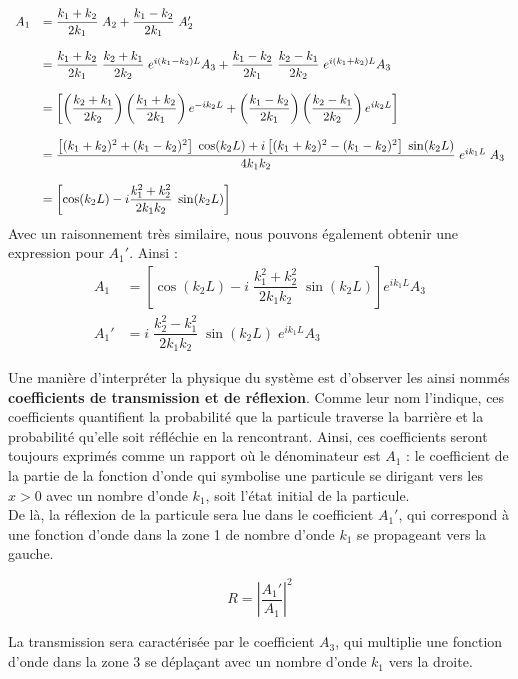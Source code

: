 \documentclass{book}
\begin{document}
$$
\begin{array}{ll}
  A_1 &=  \dfrac{k_1+k_2}{2k_1} \; A_2 + \dfrac{k_1-k_2}{2k_1} \; A_2' \\
  \strut \\
      &=  \dfrac{k_1+k_2}{2k_1} \; \dfrac{k_2+k_1}{2k_2} \; e^{i(k_1-k_2)L} A_3 + \dfrac{k_1-k_2}{2k_1} \; \dfrac{k_2-k_1}{2k_2} \; e^{i(k_1+k_2)L} A_3 \\
  \strut \\
      &= \left[\left(\dfrac{k_2+k_1}{2k_2}\right)\left(\dfrac{k_1+k_2}{2k_1}\right) e^{-ik_2L} + \left(\dfrac{k_1-k_2}{2k_1}\right)\left(\dfrac{k_2-k_1}{2k_2}\right) e^{ik_2L}\right] \\
  \strut \\
      &= \dfrac{
        \left[(k_1+k_2)^2+(k_1-k_2)^2\right] \; \cos(k_2L) +
        i\left[(k_1+k_2)^2-(k_1-k_2)^2\right] \; \sin(k_2L) 
      }{4k_1 k_2} \; e^{ik_1L} \; A_3 \\
  \strut \\
      &= \left[\cos(k_2L) - i \dfrac{k_1^2 + k_2^2}{2k_1k_2} \; \sin(k_2L)\right]
\end{array}
$$
Avec un raisonnement très similaire, nous pouvons également obtenir une expression pour $A_1'$. Ainsi : 
\begin{align}
  A_1 &= \left[\cos(k_2 L) - i \; \dfrac{k_1 ^2 + k_2 ^2}{2k_1k_2} \; \sin(k_2L) \right] e^{ik_1L}A_3 \\
  A_1 ' &= i \; \dfrac{k_2 ^2 - k_1 ^2}{2k_1 k_2}\; \sin(k_2L) \; e^{ik_1L} A_3
\end{align}

Une manière d'interpréter la physique du système est d'observer les ainsi nommés \textbf{coefficients de transmission et de réflexion}. Comme leur nom l'indique, ces coefficients quantifient la probabilité que la particule traverse la barrière et la probabilité qu'elle soit réfléchie en la rencontrant. Ainsi, ces coefficients seront toujours exprimés comme un rapport où le dénominateur est $A_1$ : le coefficient de la partie de la fonction d'onde qui symbolise une particule se dirigant vers les $x>0$ avec un nombre d'onde $k_1$, soit l'état initial de la particule.\\

De là, la réflexion de la particule sera lue dans le coefficient $A_1'$, qui correspond à une fonction d'onde dans la zone 1 de nombre d'onde $k_1$ se propageant vers la gauche.

$$ R = \left|\dfrac{A_1'}{A_1}\right|^2$$

La transmission sera caractérisée par le coefficient $A_3$, qui multiplie une fonction d'onde dans la zone 3 se déplaçant avec un nombre d'onde $k_1$ vers la droite.
\end{document}
